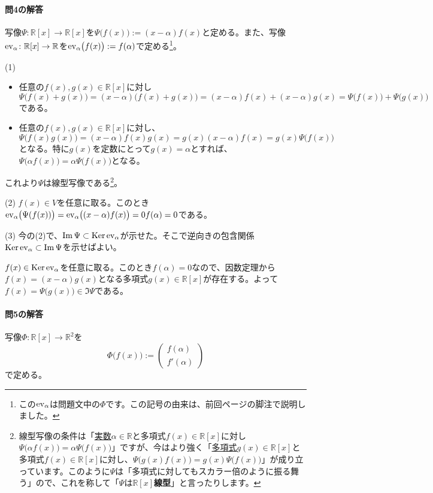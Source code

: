 \paragraph{問4の解答}

写像$\Psi\colon \mathbb{R}[x]\rightarrow\mathbb{R}[x]$を$\Psi\bigl(f(x)\bigr) := (x - \alpha) f(x)$と定める。また、写像$\operatorname{ev}_{\alpha}\colon \mathbb{R}[x]\rightarrow\mathbb{R}$を$\operatorname{ev}_{\alpha}\bigl(f(x)\bigr) := f(\alpha)$で定める\footnote{この$\operatorname{ev}_{\alpha}$は問題文中の$\Phi$です。この記号の由来は、前回\pageref{footnote:evaluation_map}ページの脚注で説明しました。}。

\noindent (1) 
\begin{itemize}
\item 任意の$f(x), g(x)\in\mathbb{R}[x]$に対し$\Psi\bigl(f(x) + g(x)\bigr) = (x - \alpha)\bigl(f(x) + g(x)\bigr) = (x - \alpha)f(x) + (x - \alpha)g(x) = \Psi\bigl(f(x)\bigr) + \Psi\bigl(g(x)\bigr)$である。
\item 任意の$f(x), g(x)\in\mathbb{R}[x]$に対し、$\Psi\bigl(f(x) g(x)\bigr) = (x - \alpha)f(x)g(x) = g(x)(x - \alpha)f(x) = g(x)\Psi\bigl(f(x)\bigr)$となる。特に$g(x)$を定数にとって$g(x) = \alpha$とすれば、$\Psi\bigl(\alpha f(x)\bigr) = \alpha \Psi\bigl(f(x)\bigr)$となる。
\end{itemize}
これより$\Psi$は線型写像である\footnote{線型写像の条件は「\uline{実数}$\alpha\in\mathbb{R}$と多項式$f(x)\in\mathbb{R}[x]$に対し$\Psi\bigl(\alpha f(x)\bigr) = \alpha\Psi\bigl(f(x)\bigr)$」ですが、今はより強く「\uline{多項式}$g(x)\in\mathbb{R}[x]$と多項式$f(x)\in\mathbb{R}[x]$に対し、$\Psi\bigl(g(x)f(x)\bigr) = g(x)\Psi\bigl(f(x)\bigr)$」が成り立っています。このように$\Psi$は「多項式に対してもスカラー倍のように振る舞う」ので、これを称して「$\Psi$は\textbf{$\mathbb{R}[x]$線型}」と言ったりします。}。

\noindent (2) $f(x) \in V$を任意に取る。このとき$\operatorname{ev}_{\alpha}\bigl(\Psi(f(x))\bigr) = \operatorname{ev}_{\alpha}\bigl((x - \alpha)f(x)\bigr) = 0 f(\alpha) = 0$である。

\noindent (3) 今の(2)で、$\mathrm{Im}\,\Psi\subset\operatorname{Ker}\operatorname{ev}_{\alpha}$が示せた。そこで逆向きの包含関係$\operatorname{Ker}\operatorname{ev}_{\alpha} \subset \mathrm{Im}\, \Psi$を示せばよい。

$f(x) \in \operatorname{Ker} \operatorname{ev}_{\alpha}$を任意に取る。このとき$f(\alpha) = 0$なので、因数定理から$f(x) = (x - \alpha)g(x)$となる多項式$g(x) \in \mathbb{R}[x]$が存在する。よって$f(x) = \Psi\bigl(g(x)\bigr) \in \Im \Psi$である。

\paragraph{問5の解答} 写像$\Phi\colon \mathbb{R}[x] \rightarrow \mathbb{R}^2$を
\[
\Phi\bigl(f(x)\bigr) := 
\begin{pmatrix}
f(\alpha) \\
f'(\alpha)
\end{pmatrix}
\]
で定める。

